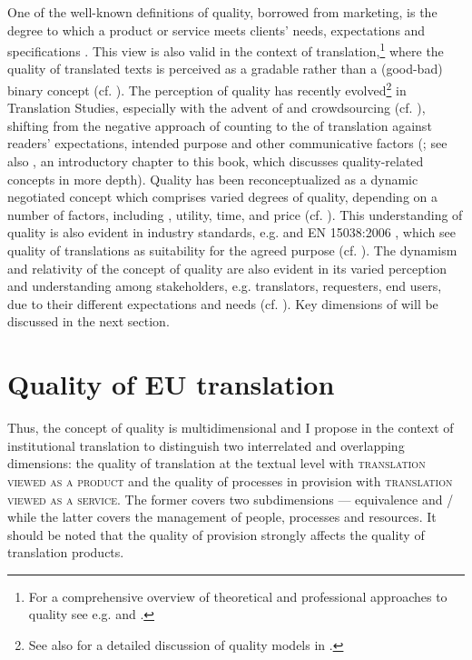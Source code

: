 \documentclass[output=paper]{langsci/langscibook}
\begin{document}
One of the well-known definitions of quality, borrowed from marketing, is the degree to which a product or service meets clients’ needs, expectations and specifications \citep[146--148]{Kotler2006}. This view is also valid in the context of translation,\footnote{For a comprehensive overview of theoretical and professional approaches to quality see e.g. \citet{Drugan2013} and \citet{House2015}.} where the quality of translated texts is perceived as a gradable rather than a (good-bad) binary concept (cf. \citealt[15]{Biel2011a}). The perception of quality has recently evolved\footnote{See also  \citet{PrietoRamos2015} for a detailed discussion of quality models in .} in Translation Studies, especially with the advent of  and crowdsourcing (cf. \citealt{Jiménez-Crespo2017}), shifting from the negative approach of  counting to the  of translation against readers’ expectations, intended purpose and other communicative factors (\citealt[238]{Colina2009}; see also \citealt{Vandepitte2017}, an introductory chapter to this book, which discusses quality-related concepts in more depth). Quality has been reconceptualized as a dynamic negotiated concept which comprises varied degrees of quality, depending on a number of factors, including , utility, time, and price (cf. \citealt[478, 482]{Jiménez-Crespo2017}). This understanding of quality is also evident in industry standards, e.g. \citeauthor{ISO2015}  and EN 15038:2006 \nocite{EN2006}, which see quality of translations as suitability for the agreed purpose (cf. \citealt{Biel2011b}). The dynamism and relativity of the concept of quality are also evident in its varied perception and understanding among stakeholders, e.g. translators, requesters, end users, due to their different expectations and needs (cf. \citealt[142--143]{Strandvik2015}). Key dimensions of  will be discussed in the next section. 

\section{Quality of EU translation}\label{sec:biel:3} 

Thus, the concept of quality is multidimensional and I propose in the context of institutional  translation to distinguish two interrelated and overlapping dimensions: the quality of translation at the textual level with \textsc{translation viewed as a product} and the quality of processes in  provision with \textsc{translation viewed as a service}. The former covers two subdimensions — equivalence and / while the latter covers the management of people, processes and resources. It should be noted that the quality of  provision strongly affects the quality of translation products.
\end{document}
